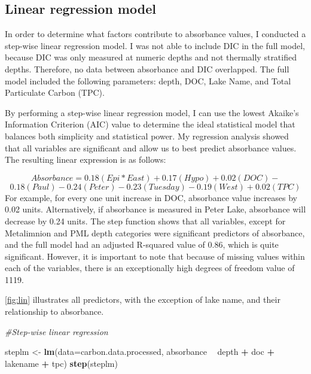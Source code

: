 \documentclass[12pt,]{article}
\newenvironment{Shaded}{\begin{snugshade}}{\end{snugshade}}
\newcommand{\KeywordTok}[1]{\textcolor[rgb]{0.13,0.29,0.53}{\textbf{#1}}}
\newcommand{\DataTypeTok}[1]{\textcolor[rgb]{0.13,0.29,0.53}{#1}}
\newcommand{\StringTok}[1]{\textcolor[rgb]{0.31,0.60,0.02}{#1}}
\newcommand{\CommentTok}[1]{\textcolor[rgb]{0.56,0.35,0.01}{\textit{#1}}}
\newcommand{\OperatorTok}[1]{\textcolor[rgb]{0.81,0.36,0.00}{\textbf{#1}}}
\newcommand{\NormalTok}[1]{#1}
\begin{document}
\newpage

\subsection{Linear regression model}\label{linear-regression-model}

In order to determine what factors contribute to absorbance values, I
conducted a step-wise linear regression model. I was not able to include
DIC in the full model, because DIC was only measured at numeric depths
and not thermally stratified depths. Therefore, no data between
absorbance and DIC overlapped. The full model included the following
parameters: depth, DOC, Lake Name, and Total Particulate Carbon (TPC).

By performing a step-wise linear regression model, I can use the lowest
Akaike's Information Criterion (AIC) value to determine the ideal
statistical model that balances both simplicity and statistical power.
My regression analysis showed that all variables are significant and
allow us to best predict absorbance values. The resulting linear
expression is as follows:

\[Absorbance = 0.18(Epi*East) + 0.17(Hypo) + 0.02(DOC) -\]
\[0.18(Paul)  - 0.24(Peter) - 0.23(Tuesday) - 0.19(West) + 0.02(TPC) \]
For example, for every one unit increase in DOC, absorbance value
increases by 0.02 units. Alternatively, if absorbance is measured in
Peter Lake, absorbance will decrease by 0.24 units. The step function
shows that all variables, except for Metalimnion and PML depth
categories were significant predictors of absorbance, and the full model
had an adjusted R-squared value of 0.86, which is quite significant.
However, it is important to note that because of missing values within
each of the variables, there is an exceptionally high degrees of freedom
value of 1119.

\autoref{fig:lin} illustrates all predictors, with the exception of lake
name, and their relationship to absorbance.

\begin{Shaded}
\begin{Highlighting}[]
\CommentTok{#Step-wise linear regression}

\NormalTok{steplm <-}\StringTok{ }\KeywordTok{lm}\NormalTok{(}\DataTypeTok{data=}\NormalTok{carbon.data.processed, absorbance }\OperatorTok{~}\StringTok{ }\NormalTok{depth }\OperatorTok{+}\StringTok{ }\NormalTok{doc  }\OperatorTok{+}\StringTok{ }\NormalTok{lakename }\OperatorTok{+}\StringTok{ }\NormalTok{tpc)}
\KeywordTok{step}\NormalTok{(steplm) }
\end{Highlighting}
\end{Shaded}
\end{document}
